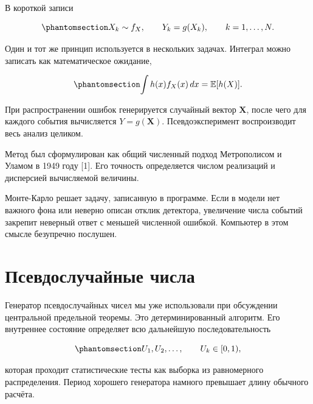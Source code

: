 \documentclass[
  russian,
  11pt,
  a4paper,
  open=any]{scrbook}
\begin{document}
В короткой записи

\begin{equation}\protect\phantomsection\label{eq-ch8-monte-carlo-sample}{
X_k\sim f_X,
\qquad
Y_k=g(X_k),
\qquad
k=1,\ldots,N.
}\end{equation}

Один и тот же принцип используется в нескольких задачах. Интеграл можно
записать как математическое ожидание,

\begin{equation}\protect\phantomsection\label{eq-ch8-integral-as-expectation}{
\int h(x)f_X(x)\,dx=\mathbb E[h(X)].
}\end{equation}

При распространении ошибок генерируется случайный вектор \(\mathbf X\),
после чего для каждого события вычисляется \(Y=g(\mathbf X)\).
Псевдоэксперимент воспроизводит весь анализ целиком.

Метод был сформулирован как общий численный подход Метрополисом и Уламом
в 1949 году {[}1{]}. Его точность определяется числом реализаций и
дисперсией вычисляемой величины.

\begin{booknote}

Монте-Карло решает задачу, записанную в программе. Если в модели нет
важного фона или неверно описан отклик детектора, увеличение числа
событий закрепит неверный ответ с меньшей численной ошибкой. Компьютер в
этом смысле безупречно послушен.

\end{booknote}

\section{Псевдослучайные
числа}\label{ux43fux441ux435ux432ux434ux43eux441ux43bux443ux447ux430ux439ux43dux44bux435-ux447ux438ux441ux43bux430}

Генератор псевдослучайных чисел мы уже использовали при обсуждении
центральной предельной теоремы. Это детерминированный алгоритм. Его
внутреннее состояние определяет всю дальнейшую последовательность

\begin{equation}\protect\phantomsection\label{eq-ch8-uniform-pseudorandom-sequence}{
U_1,U_2,\ldots,
\qquad
U_k\in[0,1),
}\end{equation}

которая проходит статистические тесты как выборка из равномерного
распределения. Период хорошего генератора намного превышает длину
обычного расчёта.
\end{document}
